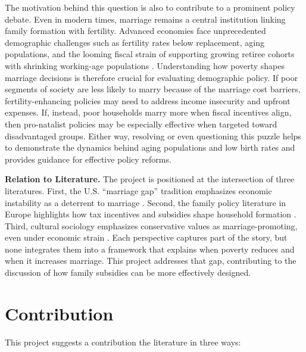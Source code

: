 The motivation behind this question is also to contribute to a prominent policy debate. Even in modern times, marriage remains a central institution linking family formation with fertility. Advanced economies face unprecedented demographic challenges such as fertility rates below replacement, aging populations, and the looming fiscal strain of supporting growing retiree cohorts with shrinking working-age populations \citep{BloomCanningFink2010, DoepkeTertilt2016}. Understanding how poverty shapes marriage decisions is therefore crucial for evaluating demographic policy. If poor segments of society are less likely to marry because of the marriage cost barriers, fertility-enhancing policies may need to address income insecurity and upfront expenses. If, instead, poor households marry more when fiscal incentives align, then pro-natalist policies may be especially effective when targeted toward disadvantaged groups. Either way, resolving or even questioning this puzzle helps to demonstrate the dynamics behind aging populations and low birth rates and provides guidance for effective policy reforms.

\noindent \textbf{Relation to Literature.}
The project is positioned at the intersection of three literatures. First, the U.S. “marriage gap” tradition emphasizes economic instability as a deterrent to marriage \citep{Wilson1987, Murray1994, EdinKefalas2005, Autor2019, GarciaHeckman2023}. Second, the family policy literature in Europe highlights how tax incentives and subsidies shape household formation \citep{Steiner2011, EllwoodJencks2004, DoepkeKindermann2019}. Third, cultural sociology emphasizes conservative values as marriage-promoting, even under economic strain \citep{Cherlin2004, Lesthaeghe2010}. Each perspective captures part of the story, but none integrates them into a framework that explains when poverty reduces and when it increases marriage. This project addresses that gap, contributing to the discussion of how family subsidies can be more effectively designed.

\section*{Contribution}

This project suggests a contribution the literature in three ways:

